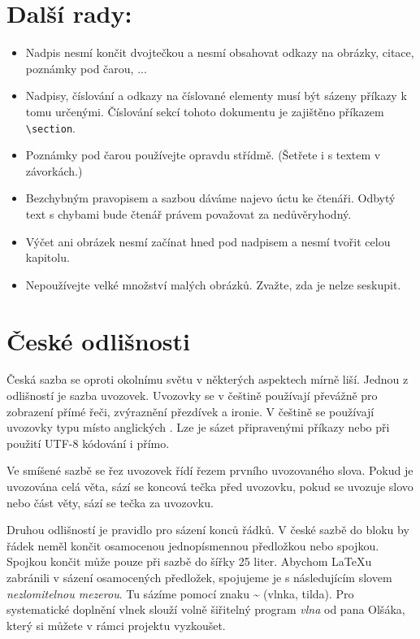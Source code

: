 \documentclass[10pt,a4paper,twocolumn]{article}
\begin{document}
\section{Další rady:}
\begin{itemize}
    \item Nadpis nesmí končit dvojtečkou a nesmí obsahovat odkazy na obrázky, citace, poznámky pod čarou, ...
    \item Nadpisy, číslování a odkazy na číslované elementy musí být sázeny příkazy k tomu určenými.
            Číslování sekcí tohoto dokumentu je zajištěno příkazem \texttt{\textbackslash section}.
    \item Poznámky pod čarou\footnotemark{} používejte opravdu střídmě. (Šetřete i s textem v závorkách.)
    \item Bezchybným pravopisem a sazbou dáváme najevo úctu ke čtenáři.
            Odbytý text s chybami bude čtenář právem považovat za nedůvěryhodný.
    \item Výčet ani obrázek nesmí začínat hned pod nadpisem a nesmí tvořit celou kapitolu.
    \item Nepoužívejte velké množství malých obrázků.
            Zvažte, zda je nelze seskupit.
\end{itemize}

\section{ České odlišnosti}
Česká sazba se oproti okolnímu světu v některých aspektech mírně liší.
Jednou z odlišností je sazba uvozovek.
Uvozovky se v češtině používají převážně pro zobrazení přímé řeči, zvýraznění přezdívek a ironie.
V češtině se používají uvozovky typu  místo anglických .
Lze je sázet připravenými příkazy nebo při použití UTF-8 kódování i přímo.

Ve smíšené sazbě se řez uvozovek řídí řezem prvního uvozovaného slova.
Pokud je uvozována celá věta, sází se koncová tečka před uvozovku, pokud se uvozuje slovo nebo část věty, sází se tečka za uvozovku.

Druhou odlišností je pravidlo pro sázení konců řádků.
V české sazbě do bloku by řádek neměl končit osamocenou jednopísmennou předložkou nebo spojkou.
Spojkou  končit může pouze při sazbě do šířky 25 liter.
Abychom {\LaTeX u} zabránili v sázení osamocených předložek, spojujeme je s následujícím slovem \textit{nezlomitelnou mezerou}.
Tu sázíme pomocí znaku \textbf{\~{}} (vlnka, tilda).
Pro systematické doplnění vlnek slouží volně šiřitelný program \textit{vlna} od pana Olšáka\footnotemark{}, který si můžete v rámci projektu vyzkoušet.
\end{document}
